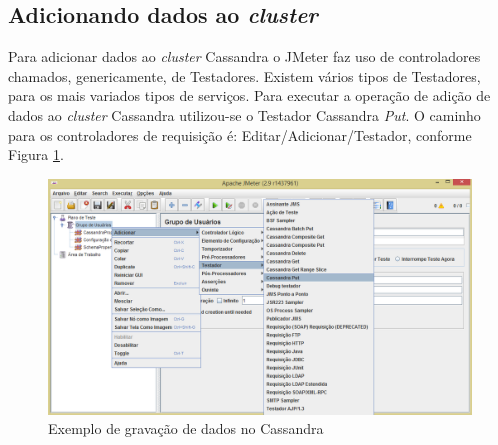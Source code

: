 \subsection{Adicionando dados ao \textit{cluster}}

Para adicionar dados ao \textit{cluster} Cassandra o JMeter faz uso de controladores chamados, genericamente, de Testadores. Existem vários tipos de Testadores, para os mais variados tipos de serviços. Para executar a operação de adição de dados ao \textit{cluster} Cassandra utilizou-se o Testador Cassandra \textit{Put}. O caminho para os controladores de requisição é: Editar/Adicionar/Testador, conforme Figura \ref{fig:cassandraput}.


   \begin{figure}[htb]
    \centering
    \includegraphics[scale=0.5]{imagens/cassandraput.png}
    \caption{Exemplo de gravação de dados no Cassandra}
    \label{fig:cassandraput}
    \end{figure}